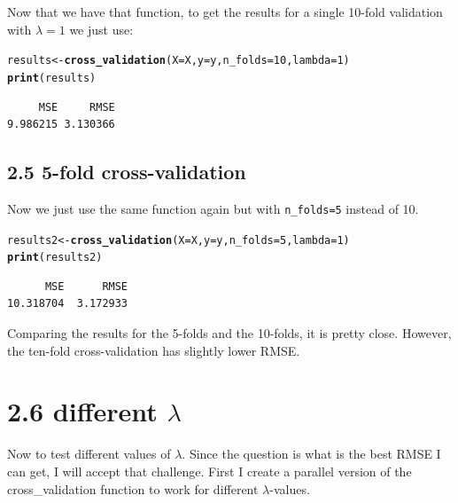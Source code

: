 \documentclass[11pt, a4paper, english]{article}\usepackage[]{graphicx}\usepackage[dvipsnames]{xcolor}
\makeatletter
\newcommand{\hlnum}[1]{\textcolor[rgb]{0.686,0.059,0.569}{#1}}%
\newcommand{\hlstd}[1]{\textcolor[rgb]{0.345,0.345,0.345}{#1}}%
\newcommand{\hlkwb}[1]{\textcolor[rgb]{0.69,0.353,0.396}{#1}}%
\newcommand{\hlkwc}[1]{\textcolor[rgb]{0.333,0.667,0.333}{#1}}%
\newcommand{\hlkwd}[1]{\textcolor[rgb]{0.737,0.353,0.396}{\textbf{#1}}}%
\newenvironment{kframe}{%
 \def\at@end@of@kframe{}%
 \ifinner\ifhmode%
  \def\at@end@of@kframe{\end{minipage}}%
  \begin{minipage}{\columnwidth}%
 \fi\fi%
 \def\FrameCommand##1{\hskip\@totalleftmargin \hskip-\fboxsep
 \colorbox{shadecolor}{##1}\hskip-\fboxsep
     \hskip-\linewidth \hskip-\@totalleftmargin \hskip\columnwidth}%
 \MakeFramed {\advance\hsize-\width
   \@totalleftmargin\z@ \linewidth\hsize
   \@setminipage}}%
 {\par\unskip\endMakeFramed%
 \at@end@of@kframe}
\newenvironment{knitrout}{}{} %
\makeatother
\begin{document}
Now that we have that function, to get the results for a single 10-fold validation with $\lambda=1$  we just use:
\begin{knitrout}
\color{fgcolor}\begin{kframe}
\begin{alltt}
\hlstd{results} \hlkwb{<-} \hlkwd{cross_validation}\hlstd{(}\hlkwc{X}\hlstd{= X,}\hlkwc{y}\hlstd{= y,} \hlkwc{n_folds}\hlstd{=}\hlnum{10}\hlstd{,} \hlkwc{lambda}\hlstd{=}\hlnum{1}\hlstd{)}
\hlkwd{print}\hlstd{(results)}
\end{alltt}
\begin{verbatim}
     MSE     RMSE 
9.986215 3.130366 
\end{verbatim}
\end{kframe}
\end{knitrout}
\subsection{2.5 5-fold cross-validation}
Now we just use the same function again but with \texttt{n\_folds=5} instead of 10.

\begin{knitrout}
\color{fgcolor}\begin{kframe}
\begin{alltt}
\hlstd{results2} \hlkwb{<-} \hlkwd{cross_validation}\hlstd{(}\hlkwc{X}\hlstd{= X,}\hlkwc{y}\hlstd{= y,} \hlkwc{n_folds}\hlstd{=}\hlnum{5}\hlstd{,} \hlkwc{lambda}\hlstd{=}\hlnum{1}\hlstd{)}
\hlkwd{print}\hlstd{(results2)}
\end{alltt}
\begin{verbatim}
      MSE      RMSE 
10.318704  3.172933 
\end{verbatim}
\end{kframe}
\end{knitrout}


Comparing the results for the 5-folds and the 10-folds, it is pretty close. However, the ten-fold cross-validation has slightly lower RMSE.
\section{2.6 different $\lambda$ }
Now to test different values of $\lambda$. 
Since the question is what is the best RMSE I can get, I will accept that challenge.  First I create a parallel version of the cross\_validation function to work for different $\lambda$-values. 
\end{document}
